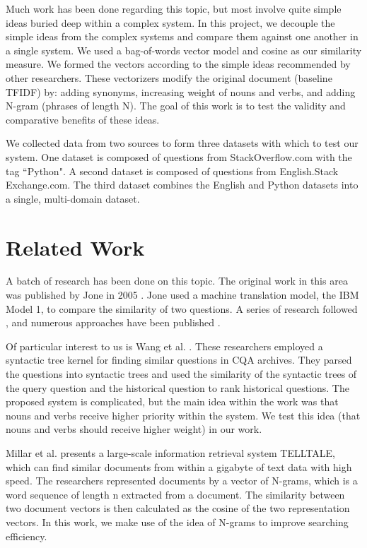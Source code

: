 \documentclass{acm_proc_article-sp}
\begin{document}
Much work has been done regarding this topic, but most involve quite simple ideas buried deep within a complex system. In this project, we decouple the simple ideas from the complex systems and compare them against one another in a single system. We used a bag-of-words vector model and cosine as our similarity measure. We formed the vectors according to the simple ideas recommended by other researchers. These vectorizers modify the original document (baseline TFIDF) by: adding synonyms, increasing weight of nouns and verbs, and adding N-gram (phrases of length N). The goal of this work is to test the validity and comparative benefits of these ideas.

We collected data from two sources to form three datasets with which to test our system. One dataset is composed of questions from StackOverflow.com with the tag ``Python". A second dataset is composed of questions from English.Stack
Exchange.com. 
The third dataset combines the English and Python datasets into a single, multi-domain dataset.


\section{Related Work}
A batch of research has been done on this topic. The original work in this area was published by  Jone in 2005 \cite{jeon2005finding}. Jone used a machine translation model, the IBM Model 1, to compare the similarity of two questions.  A series of research followed , and numerous approaches have been published \cite{cao2009use, jijkoun2005retrieving, wang2009syntactic, millar2006performance, liu2009searching}. %

Of particular interest to us is Wang et al. \cite{wang2009syntactic}. These researchers employed a syntactic tree kernel for finding similar questions in CQA archives. They parsed the questions into syntactic trees and used the similarity of the syntactic trees of the query question and the historical question to rank historical questions. The proposed system is complicated, but the main idea within the work was that nouns and verbs receive higher priority within the system. We test this idea (that nouns and verbs should receive higher weight) in our work.

Millar et al. \cite {millar2006performance} presents a large-scale information retrieval system TELLTALE, which can find similar documents from within a gigabyte of text data with high speed.  The researchers represented documents by a vector of N-grams, which is a word sequence of length n extracted from a document. The similarity between two document vectors is then calculated as the cosine of the two representation vectors. In this work, we make use of the idea of N-grams to improve searching efficiency.
 
\end{document}
